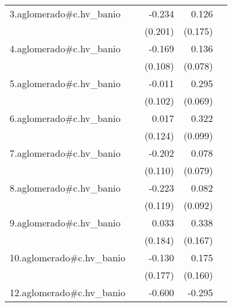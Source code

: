 {\begin{longtable}{l*{4}{D{.}{.}{-1}}}
\addlinespace
3.aglomerado#c.hv\_banio&                     &      -0.234         &       0.126         &                     \\
            &                     &     (0.201)         &     (0.175)         &                     \\
\addlinespace
4.aglomerado#c.hv\_banio&                     &      -0.169         &       0.136         &                     \\
            &                     &     (0.108)         &     (0.078)         &                     \\
\addlinespace
5.aglomerado#c.hv\_banio&                     &      -0.011         &       0.295\sym{***}&                     \\
            &                     &     (0.102)         &     (0.069)         &                     \\
\addlinespace
6.aglomerado#c.hv\_banio&                     &       0.017         &       0.322\sym{**} &                     \\
            &                     &     (0.124)         &     (0.099)         &                     \\
\addlinespace
7.aglomerado#c.hv\_banio&                     &      -0.202         &       0.078         &                     \\
            &                     &     (0.110)         &     (0.079)         &                     \\
\addlinespace
8.aglomerado#c.hv\_banio&                     &      -0.223         &       0.082         &                     \\
            &                     &     (0.119)         &     (0.092)         &                     \\
\addlinespace
9.aglomerado#c.hv\_banio&                     &       0.033         &       0.338\sym{*}  &                     \\
            &                     &     (0.184)         &     (0.167)         &                     \\
\addlinespace
10.aglomerado#c.hv\_banio&                     &      -0.130         &       0.175         &                     \\
            &                     &     (0.177)         &     (0.160)         &                     \\
\addlinespace
12.aglomerado#c.hv\_banio&                     &      -0.600\sym{***}&      -0.295\sym{*}  &                     \\

\end{longtable}}
